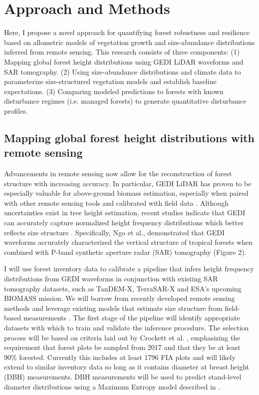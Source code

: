 \section{Approach and Methods}

Here, I propose a novel approach for quantifying forest robustness and resilience based on allometric models of vegetation growth and size-abundance distributions inferred from remote sensing. This research consists of three components: (1) Mapping global forest height distributions using GEDI LiDAR waveforms and SAR tomography. (2) Using size-abundance distributions and climate data to parameterize size-structured vegetation models and establish baseline expectations. (3) Comparing modeled predictions to forests with known disturbance regimes (i.e. managed forests) to generate quantitative disturbance profiles. 

\subsection{Mapping global forest height distributions with remote sensing} \label{task1}

Advancements in remote sensing now allow for the reconstruction of forest structure with increasing accuracy. In particular, GEDI LiDAR has proven to be especially valuable for above-ground biomass estimation, especially when paired with other remote sensing tools and calibrated with field data \cite{chi_national_2015, crockett_structural_2023, potapov_mapping_2021}. Although uncertainties exist in tree height estimation, recent studies indicate that GEDI can accurately capture normalized height frequency distributions which better reflects size structure \cite{tan_exploring_2024}. Specifically, Ngo et al., \cite{ngo_tropical_2022} demonstrated that GEDI waveforms accurately characterized the vertical structure of tropical forests when combined with P-band synthetic aperture radar (SAR) tomography (Figure 2).

I will use forest inventory data to calibrate a pipeline that infers height frequency distributions from GEDI waveforms in conjunction with existing SAR tomography datasets, such as TanDEM-X, TerraSAR-X and ESA’s upcoming BIOMASS mission. We will borrow from recently developed remote sensing methods and leverage existing models that estimate size structure from field-based measurements \cite{ngo_tropical_2022, ramachandran_evaluation_2021}. 
The first stage of the pipeline will identify appropriate datasets with which to train and validate the inference procedure. The selection process will be based on criteria laid out by Crockett et al. \cite{crockett_structural_2023}, emphasizing the requirement that forest plots be sampled from 2017 and that they be at least 90\% forested. Currently this includes at least 1796 FIA plots and will likely extend to similar inventory data so long as it contains diameter at breast height (DBH) measurements. DBH measurements will be used to predict stand-level diameter distributions using a Maximum Entropy model described in \cite{chen_stand_2019}.

